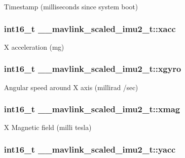 Timestamp (milliseconds since system boot) 

\hypertarget{struct____mavlink__scaled__imu2__t_a2c8c83e7ed02afb465ecc3460a2eb1c0}{
\subsubsection[{xacc}]{\setlength{\rightskip}{0pt plus 5cm}int16\+\_\+t \+\_\+\+\_\+mavlink\+\_\+scaled\+\_\+imu2\+\_\+t\+::xacc}}\label{struct____mavlink__scaled__imu2__t_a2c8c83e7ed02afb465ecc3460a2eb1c0}


X acceleration (mg) 

\hypertarget{struct____mavlink__scaled__imu2__t_a8881bee7f341258b6dad3f0463f4c58f}{
\subsubsection[{xgyro}]{\setlength{\rightskip}{0pt plus 5cm}int16\+\_\+t \+\_\+\+\_\+mavlink\+\_\+scaled\+\_\+imu2\+\_\+t\+::xgyro}}\label{struct____mavlink__scaled__imu2__t_a8881bee7f341258b6dad3f0463f4c58f}


Angular speed around X axis (millirad /sec) 

\hypertarget{struct____mavlink__scaled__imu2__t_a5c1bc2a4c5e9f770abc9e1225338851b}{
\subsubsection[{xmag}]{\setlength{\rightskip}{0pt plus 5cm}int16\+\_\+t \+\_\+\+\_\+mavlink\+\_\+scaled\+\_\+imu2\+\_\+t\+::xmag}}\label{struct____mavlink__scaled__imu2__t_a5c1bc2a4c5e9f770abc9e1225338851b}


X Magnetic field (milli tesla) 

\hypertarget{struct____mavlink__scaled__imu2__t_a4a0c2131afa7457a2aaeab7899e35c81}{
\subsubsection[{yacc}]{\setlength{\rightskip}{0pt plus 5cm}int16\+\_\+t \+\_\+\+\_\+mavlink\+\_\+scaled\+\_\+imu2\+\_\+t\+::yacc}}\label{struct____mavlink__scaled__imu2__t_a4a0c2131afa7457a2aaeab7899e35c81}


